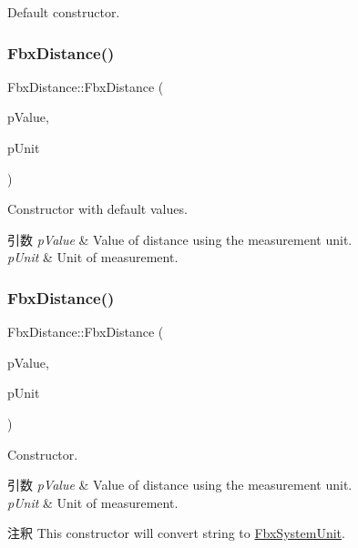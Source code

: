 Default constructor. 

\mbox{\label{class_fbx_distance_ac3516e60b8b7477771d80a3de049d1b2}} 
\subsubsection{\texorpdfstring{Fbx\+Distance()}{FbxDistance()}\hspace{0.1cm}{\footnotesize\ttfamily [2/3]}}
{\footnotesize\ttfamily Fbx\+Distance\+::\+Fbx\+Distance (\begin{DoxyParamCaption}\item[{float}]{p\+Value,  }\item[{\hyperlink{class_fbx_system_unit}{Fbx\+System\+Unit}}]{p\+Unit }\end{DoxyParamCaption})}

Constructor with default values. 
\begin{DoxyParams}{引数}
{\em p\+Value} & Value of distance using the measurement unit. \\
\hline
{\em p\+Unit} & Unit of measurement. \\
\hline
\end{DoxyParams}
\mbox{\label{class_fbx_distance_aa171246a31a5156574c38208c08ec369}} 
\subsubsection{\texorpdfstring{Fbx\+Distance()}{FbxDistance()}\hspace{0.1cm}{\footnotesize\ttfamily [3/3]}}
{\footnotesize\ttfamily Fbx\+Distance\+::\+Fbx\+Distance (\begin{DoxyParamCaption}\item[{float}]{p\+Value,  }\item[{const char $\ast$}]{p\+Unit }\end{DoxyParamCaption})}

Constructor. 
\begin{DoxyParams}{引数}
{\em p\+Value} & Value of distance using the measurement unit. \\
\hline
{\em p\+Unit} & Unit of measurement. \\
\hline
\end{DoxyParams}
\begin{DoxyRemark}{注釈}
This constructor will convert string to \hyperlink{class_fbx_system_unit}{Fbx\+System\+Unit}. 
\end{DoxyRemark}
\mbox{\label{class_fbx_distance_a3100f1352cf1a25bee257fb15788fe86}} 
